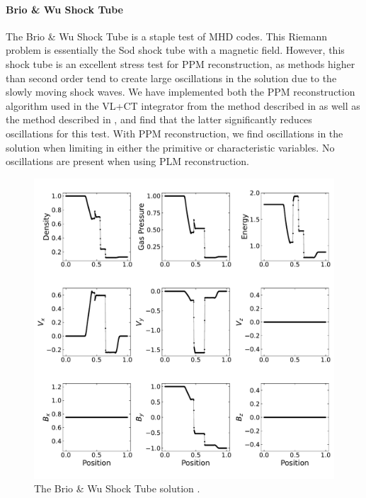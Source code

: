 \paragraph{Brio \& Wu Shock Tube}

The Brio \& Wu Shock Tube \citep{brio_wu_1988} is a staple test of MHD codes. This Riemann problem is essentially the Sod shock tube \citep{sod_1978} with a magnetic field. However, this shock tube is an excellent stress test for PPM reconstruction, as methods higher than second order tend to create large oscillations in the solution due to the slowly moving shock waves. We have implemented both the PPM reconstruction algorithm used in the VL+CT integrator from the method described in \cite{stone_athena_2008} as well as the method described in \cite{felker_2018}, and find that the latter significantly reduces oscillations for this test. With PPM reconstruction, we find  oscillations in the solution when limiting in either the primitive or characteristic variables. No oscillations are present when using PLM reconstruction.

\begin{figure}[ht!]
    \includegraphics[width=\linewidth]{assets/3-mhd-tests/b&w.pdf}
    \caption{The Brio \& Wu Shock Tube solution \citep{brio_wu_1988}.
    }
    \label{fig:brio-and-wu}
\end{figure}

